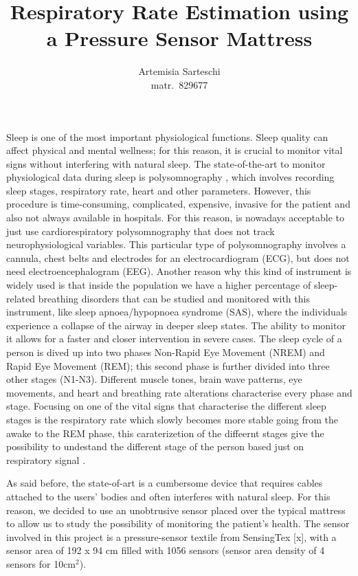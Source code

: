 \documentclass[a4paper,11pt, oneside,italian]{article}
\title{Respiratory Rate Estimation using a Pressure Sensor Mattress}
\author{Artemisia Sarteschi\\\smaller matr.~829677}
\date{}
\begin{document}
\maketitle
{}
\noindent



Sleep is one of the most important physiological functions. Sleep quality can affect physical 
and mental wellness; for this reason,
 it is crucial to monitor vital signs without interfering with natural sleep. 
 The state-of-the-art to monitor physiological data during sleep is polysomnography %
 , which involves recording sleep stages, respiratory rate, heart and other parameters. However, this procedure is time-consuming, 
 complicated, expensive, invasive for the patient and also not always available in hospitals. For this reason, is nowadays 
 acceptable to just use cardiorespiratory polysomnography that does not track neurophysiological variables. This particular type of polysomnography
involves a cannula, chest belts and electrodes for an electrocardiogram (ECG), but does not need electroencephalogram (EEG).
Another reason why this kind of instrument is widely used is that inside the population we have a higher percentage of 
sleep-related breathing disorders that can be studied and monitored with this instrument, like sleep apnoea/hypopnoea syndrome (SAS), where the individuals experience a collapse 
of the airway in deeper sleep states. The ability to monitor it allows for a faster and closer intervention in severe cases. 
The sleep cycle of a person is dived up into two  phases Non-Rapid Eye Movement (NREM) and Rapid Eye Movement (REM);
  this second phase is further divided into three other stages (N1-N3). Different muscle tones, brain wave patterns, 
  eye movements, and heart and breathing rate alterations characterise every phase and stage.
Focusing on one of the vital signs that characterise the different sleep stages is the respiratory rate 
which slowly becomes more stable going from the awake to the REM phase, this caraterizetion of the diffeernt stages give the possibility to 
undestand the different stage of the person based just on respiratory signal \cite{Bakker2021EstimatingSeverity}. 

As said before, the state-of-art is a cumbersome device that 
requires cables attached to the users' bodies and often interferes with 
natural sleep. For this reason, we decided to use an unobtrusive sensor 
placed over the typical mattress to allow us to study the possibility of
 monitoring the patient's health. The sensor involved in this project is a 
 pressure-sensor textile from SensingTex [x], with a sensor area of 192 x 94 
 cm filled with 1056 sensors (sensor area density of 4 sensors for 10cm$^2$).
\end{document}
